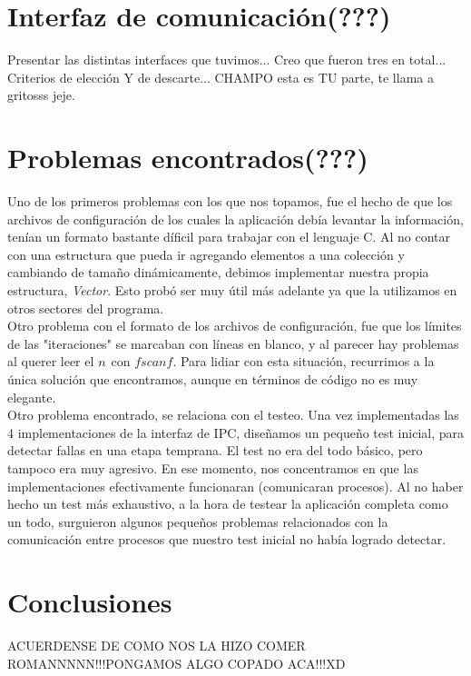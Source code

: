 \documentclass[a4paper,10pt]{article}
\begin{document}
\newpage
\section{Interfaz de comunicación(???)}
Presentar las distintas interfaces que tuvimos...
Creo que fueron tres en total... 
Criterios de elección Y de descarte...
CHAMPO esta es TU parte, te llama a gritosss jeje.

\newpage
\section{Problemas encontrados(???)}

Uno de los primeros problemas con los que nos topamos, fue el hecho de que los archivos de configuración de los cuales la aplicación debía levantar la información, tenían un formato
bastante díficil para trabajar con el lenguaje C. Al no contar con una estructura que pueda ir agregando elementos a una colección y cambiando de tamaño dinámicamente, debimos 
implementar nuestra propia estructura, \textit{Vector}. Esto probó ser muy útil más adelante ya que la utilizamos en otros sectores del programa.\\

Otro problema con el formato de los archivos de configuración, fue que los límites de las "iteraciones" se marcaban con líneas en blanco, y al parecer hay problemas al querer leer el 
$\\n$ con $fscanf$. Para lidiar con esta situación, recurrimos a la única solución que encontramos, aunque en términos de código no es muy elegante.\\

Otro problema encontrado, se relaciona con el testeo. Una vez implementadas las 4 implementaciones de la interfaz de IPC, diseñamos un pequeño test inicial, para detectar fallas en una 
etapa temprana. El test no era del todo básico, pero tampoco era muy agresivo. En ese momento, nos concentramos en que las implementaciones efectivamente funcionaran (comunicaran
 procesos). Al no haber hecho un test más exhaustivo, a la hora de testear la aplicación completa como un todo, surguieron algunos pequeños problemas relacionados con la 
 comunicación entre procesos que nuestro test inicial no había logrado detectar.\\

\newpage
\section{Conclusiones}
ACUERDENSE DE COMO NOS LA HIZO COMER ROMANNNNN!!!PONGAMOS ALGO COPADO ACA!!!XD
\end{document}
